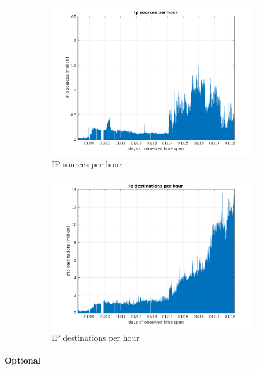 \documentclass{article}
\begin{document}
\begin{figure}[h]
\begin{subfigure}{.5\textwidth}
        \includegraphics[width=\textwidth]{../exercise-3/plots/rep_10_3}
        \caption{IP sources per hour}
    \end{subfigure}
    \begin{subfigure}{.5\textwidth}
        \centering
        \includegraphics[width=\textwidth]{../exercise-3/plots/rep_10_4}
        \caption{IP destinations per hour}
    \end{subfigure}
    \caption{\label{figure:rep-10}}
\end{figure}

\paragraph{Optional}
\end{document}
